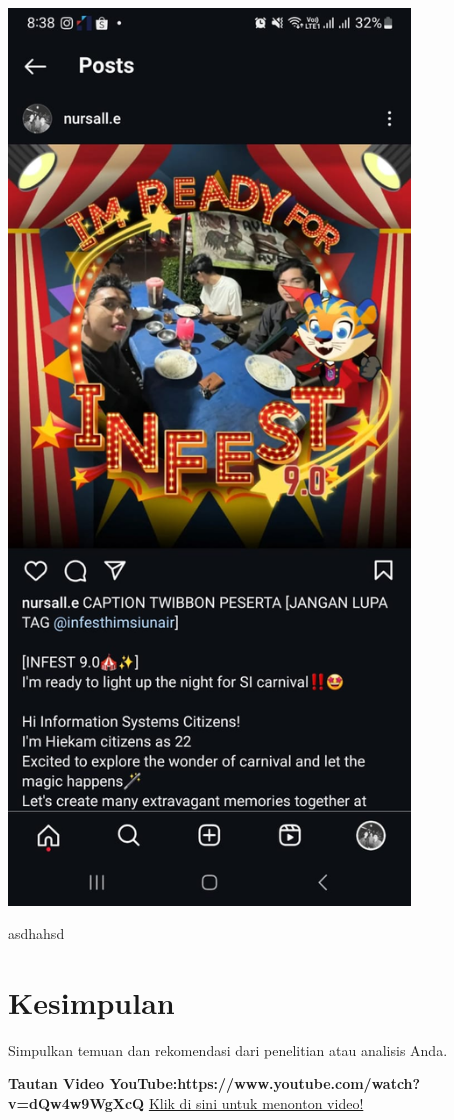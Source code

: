 \documentclass{article}
\begin{document}
\includegraphics[width=0.8\textwidth]{images/1_20241102151715.jpg} %



asdhahsd

\section{Kesimpulan}

Simpulkan temuan dan rekomendasi dari penelitian atau analisis Anda.




\textbf{Tautan Video YouTube:https://www.youtube.com/watch?v=dQw4w9WgXcQ} \hyperlink{https://www.youtube.com/watch?v=dQw4w9WgXcQ}{Klik di sini untuk menonton video!}
\end{document}
